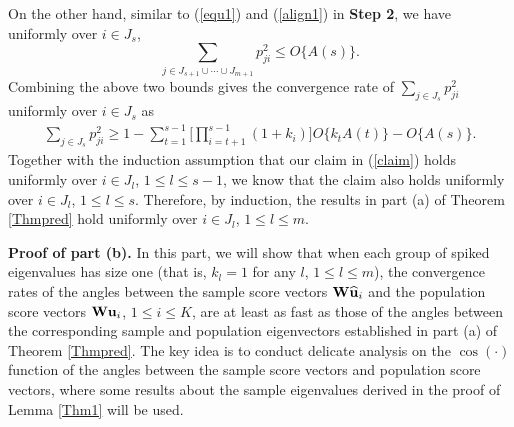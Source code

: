 \documentclass{statsoc}
\newcommand{\bu}{\mbox{\bf u}}
\newcommand{\bW}{\mbox{\bf W}}
\begin{document}
On the other hand, similar to (\ref{equ1}) and (\ref{align1}) in \textbf{Step 2}, we have uniformly over $i \in J_{s}$,
\[\sum_{j \in J_{s + 1} \cup \cdots \cup J_{m + 1}} p_{ji}^2 \leq O\{A(s)\}.\]
Combining the above two bounds gives the convergence rate of $\sum_{j \in J_{s}} p_{ji}^2$ uniformly over $i \in J_{s}$ as
\begin{align*}
\sum_{j \in J_{s}} p_{ji}^2 \geq 1 - \sum_{t = 1}^{s - 1} \big[\prod_{i = t + 1}^{s - 1} (1 + k_i)\big] O\{k_t A(t)\} - O\{A(s)\}.
\end{align*}
Together with the induction assumption that our claim in (\ref{claim}) holds uniformly over $i \in J_l$, $1 \leq l \leq s - 1$, we know that the claim also holds uniformly over $i \in J_l$, $1 \leq l \leq s$. Therefore, by induction, the results in part (a) of Theorem \ref{Thmpred} hold uniformly over $i \in J_l$, $1 \leq l \leq m$.

\bigskip

\noindent \textbf{Proof of part (b).} In this part, we will show that when each group of spiked eigenvalues has size one (that is, $k_l = 1$ for any $l$, $1 \leq l \leq m$), the convergence rates of the angles between the sample score vectors $\bW \widehat{\bu}_i$ and the population score vectors $\bW \bu_i$, $1 \leq i \leq K$, are at least as fast as those of the angles between the corresponding sample and population eigenvectors established in part (a) of Theorem \ref{Thmpred}. The key idea is to conduct delicate analysis on the $\cos(\cdot)$ function of the angles between the sample score vectors and population score vectors, where some results about the sample eigenvalues derived in the proof of Lemma \ref{Thm1} will be used.
\end{document}
